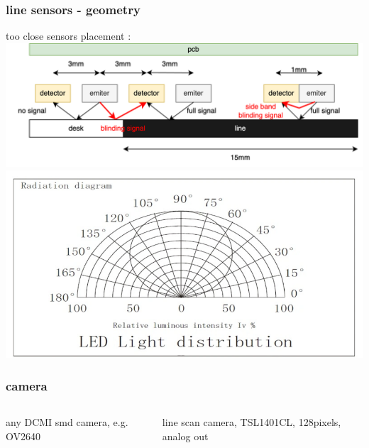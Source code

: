 \documentclass{beamer}
\begin{document}
\begin{frame}

  \frametitle{\bf line sensors - geometry}
  too close sensors placement : \\
  \includegraphics[scale=0.6]{../images/sensors/sensor-ls_2.png}
  \\
  \includegraphics[scale=0.4]{../images/sensors/led_radiating.png}
\end{frame}

\begin{frame}

  \frametitle{\bf camera}
  
  \begin{columns}

    \begin{column}{0.5\textwidth}
      any DCMI smd camera, e.g. OV2640
    \end{column}

    \begin{column}{0.5\textwidth}
      line scan camera, TSL1401CL, 128pixels, analog out
    \end{column}

   
  \end{columns}

\end{frame}
\end{document}
